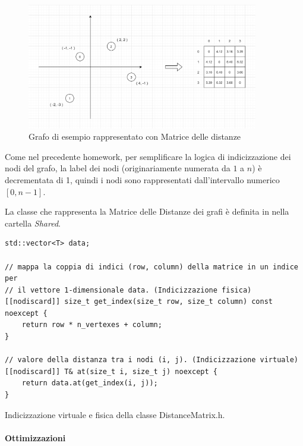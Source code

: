\begin{figure}[h]
	\centering
	\includegraphics[width=0.9\textwidth]{./images/Distance Matrix.png}
	\caption{Grafo di esempio rappresentato con Matrice delle distanze}
	\label{fig:distancematrix-example}
\end{figure}

\noindent Come nel precedente homework, per semplificare la logica di indicizzazione dei nodi del grafo, la label dei nodi (originariamente numerata da $1$ a $n$) è decrementata di 1, quindi i nodi sono rappresentati dall'intervallo numerico $[0, n-1]$.

\noindent La classe che rappresenta la Matrice delle Distanze dei grafi è definita in  nella cartella \textit{Shared}.

\begin{listing}[!ht]
\begin{verbatim}
std::vector<T> data;

// mappa la coppia di indici (row, column) della matrice in un indice per
// il vettore 1-dimensionale data. (Indicizzazione fisica)
[[nodiscard]] size_t get_index(size_t row, size_t column) const noexcept {
    return row * n_vertexes + column;
}

// valore della distanza tra i nodi (i, j). (Indicizzazione virtuale)
[[nodiscard]] T& at(size_t i, size_t j) noexcept {
    return data.at(get_index(i, j));
}
\end{verbatim}
\caption{Indicizzazione virtuale e fisica della classe DistanceMatrix.h.}
\label{listing:virtual-physica-addressing}
\end{listing}

\paragraph{Ottimizzazioni}\mbox{} \\

